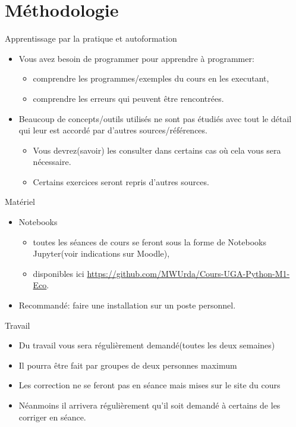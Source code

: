 \section{Méthodologie}
\frame{\sectionpage}

\begin{frame}[allowframebreaks]{Apprentissage par la pratique et autoformation}
    \begin{itemize}
        \item Vous avez besoin de programmer pour apprendre à programmer:
        \begin{itemize}
            \item comprendre les programmes/exemples du cours en les executant,
            \item comprendre les erreurs qui peuvent être rencontrées.
        \end{itemize}
        \item Beaucoup de concepts/outils utilisés ne sont pas étudiés avec tout le détail qui leur est accordé 
        par d'autres sources/références.
        \begin{itemize}
            \item Vous devrez(savoir) les consulter dans certains cas où cela vous sera nécessaire.
            \item Certains exercices seront repris d'autres sources.
        \end{itemize}
    \end{itemize}
\end{frame}

\begin{frame}[allowframebreaks]{Matériel}
    \begin{itemize}
        \item Notebooks
        \begin{itemize}
            \item toutes les séances de cours se feront sous la forme de Notebooks Jupyter(voir indications sur Moodle),
            \item disponibles ici \url{https://github.com/MWUrda/Cours-UGA-Python-M1-Eco}.
        \end{itemize} 
        \item  Recommandé: faire une installation sur un poste personnel.
    \end{itemize}
\end{frame}

\begin{frame}[allowframebreaks]{Travail}
\begin{itemize}
    \item Du travail vous sera régulièrement demandé(toutes les deux semaines)
    \item Il pourra être fait par groupes de deux personnes maximum
    \item Les correction ne se feront pas en séance mais mises sur le site du cours
    \item Néanmoins il arrivera régulièrement qu'il soit demandé à certains de les corriger en séance.
\end{itemize}
\end{frame}

